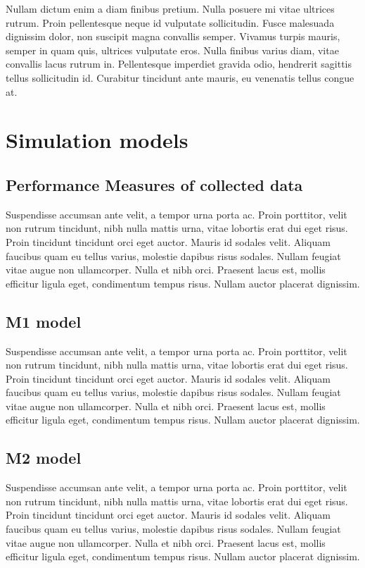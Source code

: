 \documentclass{article}
\begin{document}
Nullam dictum enim a diam finibus pretium. Nulla posuere mi vitae ultrices rutrum. Proin pellentesque neque id vulputate sollicitudin. Fusce malesuada dignissim dolor, non suscipit magna convallis semper. Vivamus turpis mauris, semper in quam quis, ultrices vulputate eros. Nulla finibus varius diam, vitae convallis lacus rutrum in. Pellentesque imperdiet gravida odio, hendrerit sagittis tellus sollicitudin id. Curabitur tincidunt ante mauris, eu venenatis tellus congue at.

\section{Simulation models}

\subsection{Performance Measures of collected data}

Suspendisse accumsan ante velit, a tempor urna porta ac. Proin porttitor, velit non rutrum tincidunt, nibh nulla mattis urna, vitae lobortis erat dui eget risus. Proin tincidunt tincidunt orci eget auctor. Mauris id sodales velit. Aliquam faucibus quam eu tellus varius, molestie dapibus risus sodales. Nullam feugiat vitae augue non ullamcorper. Nulla et nibh orci. Praesent lacus est, mollis efficitur ligula eget, condimentum tempus risus. Nullam auctor placerat dignissim.

\subsection{M1 model}

Suspendisse accumsan ante velit, a tempor urna porta ac. Proin porttitor, velit non rutrum tincidunt, nibh nulla mattis urna, vitae lobortis erat dui eget risus. Proin tincidunt tincidunt orci eget auctor. Mauris id sodales velit. Aliquam faucibus quam eu tellus varius, molestie dapibus risus sodales. Nullam feugiat vitae augue non ullamcorper. Nulla et nibh orci. Praesent lacus est, mollis efficitur ligula eget, condimentum tempus risus. Nullam auctor placerat dignissim.

\subsection{M2 model}

Suspendisse accumsan ante velit, a tempor urna porta ac. Proin porttitor, velit non rutrum tincidunt, nibh nulla mattis urna, vitae lobortis erat dui eget risus. Proin tincidunt tincidunt orci eget auctor. Mauris id sodales velit. Aliquam faucibus quam eu tellus varius, molestie dapibus risus sodales. Nullam feugiat vitae augue non ullamcorper. Nulla et nibh orci. Praesent lacus est, mollis efficitur ligula eget, condimentum tempus risus. Nullam auctor placerat dignissim.
\end{document}
